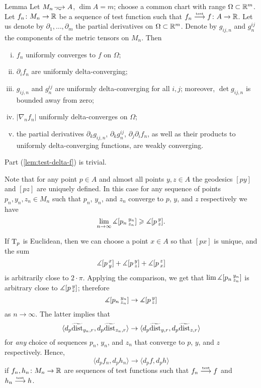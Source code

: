 \begin{thm}{Lemma}\label{lem:test-delta}
Let $M_n\smooths{} A$, $\dim A=m$;
choose a common chart with range $\Omega\subset \mathbb{R}^m$.
Let $f_n\colon M_n\to\mathbb{R}$ be a sequence of test function such that $f_n\zz\testto f\:A\to \RR$.
Let us denote by $\partial_1,\dots,\partial_m$ the partial derivatives on $\Omega\subset \mathbb{R}^m$.
Denote by $g_{ij,n}$ and $g^{ij}_n$ the components of the metric tensors on $M_n$.
Then 
\begin{enumerate}[(i)]
\item\label{lem:test-delta-f} $f_n$ uniformly converges to $f$ on $\Omega$;
\item\label{lem:test-delta-partial} $\partial_if_n$ are uniformly delta-converging;
\item\label{lem:test-delta-g}  $g_{ij,n}$ and $g^{ij}_n$ are uniformly delta-converging for all $i,j$;
moreover, $\det g_{ij,n}$ is bounded away from zero;
\item\label{lem:test-delta|nabla|} $|\nabla_n f_n|$ uniformly delta-converges on $\Omega$; %
\item\label{lem:test-delta-partial-g} the partial derivatives $\partial_kg_{ij,n}$, $\partial_k g^{ij}_n$,  $\partial_j\partial_if_n$, as well as their products to uniformly delta-converging functions,  are weakly converging.
\end{enumerate}

\end{thm}

 Part (\ref{lem:test-delta-f}) is trivial.

Note that for any point $p\in A$ and almost all points $y,z\in A$ the geodesics $[py]$ and $[pz]$ are uniquely defined.
In this case for any sequence of points $p_n,y_n,z_n\in M_n$ such that $p_n$, $y_n$, and $z_n$ converge to $p$, $y$, and $z$ respectively we have
\[\lim_{n\to\infty}\measuredangle [p_n\,{}^{y_n}_{z_n}]\geqslant \measuredangle [p\,{}^{y}_{z}].\]

If $\mathrm{T}_p$ is Euclidean, then we can choose a point $x\in A$ so that $[px]$ is unique, and the sum 
\[\measuredangle [p\,{}^{x}_{y}]+\measuredangle [p\,{}^{y}_{z}]+\measuredangle [p\,{}^{z}_{x}]\]
is arbitrarily close to $2\cdot\pi$.
Applying the comparison, we get that $\lim\measuredangle [p_n\,{}^{y_n}_{z_n}]$ is arbitrary close to $\measuredangle [p\,{}^{y}_{z}]$; therefore
\[\measuredangle [p_n\,{}^{y_n}_{z_n}]\to\measuredangle [p\,{}^{y}_{z}]\]
as $n\to\infty$.
The latter implies that
\[\langle d_p\widetilde{\operatorname{\rm dist}}_{y_n,r},d_p\widetilde{\operatorname{\rm dist}}_{z_n,r}\rangle\to \langle d_p\widetilde{\operatorname{\rm dist}}_{y,r},d_p\widetilde{\operatorname{\rm dist}}_{z,r}\rangle\]
for \emph{any} choice of sequences $p_n$, $y_n$, and $z_n$ that converge to $p$, $y$, and $z$ respectively.
Hence,
\[\langle d_pf_n,d_ph_n\rangle\to \langle d_pf,d_ph\rangle\]
if $f_n,h_n\colon M_n\to\mathbb{R}$ are sequences of test functions such that $f_n\stackrel{\text{\tiny\rm test}}{\longrightarrow} f$ and $h_n\stackrel{\text{\tiny\rm test}}{\longrightarrow} h$.

